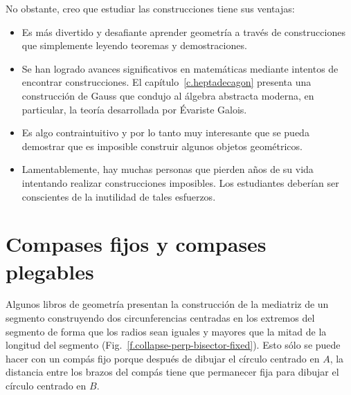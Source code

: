 No obstante, creo que estudiar las construcciones tiene sus ventajas:
\begin{itemize}
\item Es más divertido y desafiante aprender geometría a través de construcciones que simplemente leyendo teoremas y demostraciones.
\item Se han logrado avances significativos en matemáticas mediante intentos de encontrar construcciones. El capítulo~\ref{c.heptadecagon} presenta una construcción de Gauss que condujo al álgebra abstracta moderna, en particular, la teoría desarrollada por \'{E}variste Galois.
\item Es algo contraintuitivo y por lo tanto muy interesante que se pueda demostrar que es imposible construir algunos objetos geométricos.
\item Lamentablemente, hay muchas personas que pierden años de su vida intentando realizar construcciones imposibles. Los estudiantes deberían ser conscientes de la inutilidad de tales esfuerzos.
\end{itemize}

\section{Compases fijos y compases plegables}\label{s.collapse}

Algunos libros de geometría presentan la construcción de la mediatriz de un segmento construyendo dos circunferencias centradas en los extremos del segmento de forma que los radios sean iguales y mayores que la mitad de la longitud del segmento (Fig.~\ref{f.collapse-perp-bisector-fixed}). Esto sólo se puede hacer con un compás fijo porque después de dibujar el círculo centrado en $A$, la distancia entre los brazos del compás tiene que permanecer fija para dibujar el círculo centrado en $B$.

